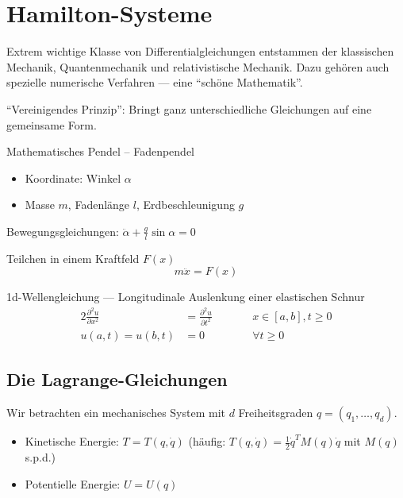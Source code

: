 \section{Hamilton-Systeme}

Extrem wichtige Klasse von Differentialgleichungen entstammen der klassischen Mechanik, Quantenmechanik und relativistische Mechanik. Dazu gehören auch spezielle numerische Verfahren --- eine \enquote{schöne Mathematik}.

\enquote{Vereinigendes Prinzip}: Bringt ganz unterschiedliche Gleichungen auf eine gemeinsame Form.


\begin{bsp}
	Mathematisches Pendel -- Fadenpendel
	\begin{itemize}
		\item Koordinate: Winkel $\alpha$
		\item Masse $m$, Fadenlänge $l$, Erdbeschleunigung $g$
	\end{itemize}
	Bewegungsgleichungen: $\displaystyle \ddot \alpha + \frac{g}{l} \sin \alpha = 0$
\end{bsp}

\begin{bsp}
	Teilchen in einem Kraftfeld $F(x)$
	\begin{equation}
	m \ddot x = F(x) \tag{Newtons Gesetz}
	\end{equation}
\end{bsp}

\begin{bsp}
	1d-Wellengleichung --- Longitudinale Auslenkung einer elastischen Schnur
	\begin{alignat*}{2}
	\frac{\partial^2 u}{\partial x^2} & = \frac{\partial^2 u}{\partial t^2} & \qquad & x \in [a, b], t \ge 0 \\
	u(a, t) = u(b, t) & = 0 && \forall t \ge 0
	\end{alignat*}
\end{bsp}


\subsection{Die Lagrange-Gleichungen}
\label{sec:lagrange_gleichung}

Wir betrachten ein mechanisches System mit $d$ Freiheitsgraden $q = (q_1, \dots, q_d)$.
\begin{itemize}
	\item Kinetische Energie: $T = T(q, \dot q)$
	(häufig: $T(q, \dot{q}) = \frac12 \dot{q}^T M(q) \dot{q}$ mit $M(q)$ s.p.d.)
	\item Potentielle Energie: $U = U(q)$
\end{itemize}

